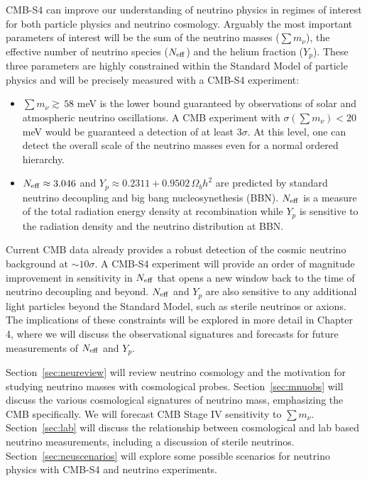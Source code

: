CMB-S4 can improve our understanding of neutrino physics in regimes of interest for both particle physics and neutrino cosmology.  Arguably the most important parameters of interest will be the sum of the neutrino masses ($\sum m_\nu$), the effective number of neutrino species ($N_{\rm eff}$) and the helium fraction ($Y_p$).  These three parameters are highly constrained within the Standard Model of particle physics and will be precisely measured with a CMB-S4 experiment:
\begin{itemize}
\item $ \sum m_\nu \gtrsim \, 58$ meV is the lower bound guaranteed by observations of solar and atmospheric neutrino oscillations.  A CMB experiment with $\sigma(\sum m_\nu) < 20$ meV would be guaranteed a detection of at least 3$\sigma$.  At this level, one can detect the overall scale of the neutrino masses even for a normal ordered hierarchy.
\item $N_{\rm eff} \approx  3.046$ and $Y_p \approx 0.2311 + 0.9502 \, \Omega_b h^2$ are predicted by standard neutrino decoupling and big bang nucleosynethesis (BBN).  $N_{\rm eff}$ is a measure of the total radiation energy density at recombination while $Y_p$ is sensitive to the radiation density and the neutrino distribution at BBN. 
\end{itemize}
Current CMB data already provides a robust detection of the cosmic neutrino background at $\sim10 \sigma$.  A CMB-S4 experiment will provide an order of magnitude improvement in sensitivity in $N_{\rm eff}$ that opens a new window back to the time of neutrino decoupling and beyond.  $N_{\rm eff}$ and $Y_p$ are also sensitive to any additional light particles beyond the Standard Model, such as sterile neutrinos or axions.  The implications of these constraints will be explored in more detail in Chapter 4, where we will discuss the observational signatures and forecasts for future measurements of $N_{\rm eff}$ and $Y_p$.  

Section~\ref{sec:neureview} will review neutrino cosmology and the motivation for studying neutrino masses with cosmological probes.  Section~\ref{sec:mnuobs} will discuss the various cosmological signatures of neutrino mass, emphasizing the CMB specifically.  We will forecast CMB Stage IV sensitivity to $\sum m_\nu$.  Section~\ref{sec:lab} will discuss the relationship between cosmological and lab based neutrino measurements, including a discussion of sterile neutrinos.  Section~\ref{sec:neuscenarios} will explore some possible scenarios for neutrino physics with CMB-S4 and neutrino experiments.

